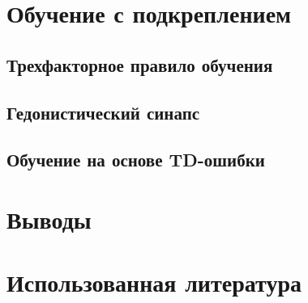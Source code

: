 \documentclass[a4paper,10pt]{article}
\begin{document}
\section{Обучение с подкреплением}
\subsection{Трехфакторное правило обучения}
\subsection{Гедонистический синапс}
\subsection{Обучение на основе TD-ошибки}
\section{Выводы}
\section{Использованная литература}
{}

\end{document}

